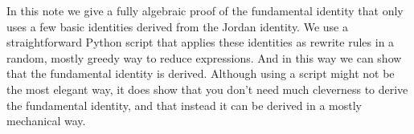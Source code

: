 \documentclass{article}
\begin{document}
In this note we give a fully algebraic proof of the fundamental identity that only uses a few basic identities derived from the Jordan identity. We use a straightforward Python script that applies these identities as rewrite rules in a random, mostly greedy way to reduce expressions. And in this way we can show that the fundamental identity is derived. Although using a script might not be the most elegant way, it does show that you don't need much cleverness to derive the fundamental identity, and that instead it can be derived in a mostly mechanical way.

\end{document}

